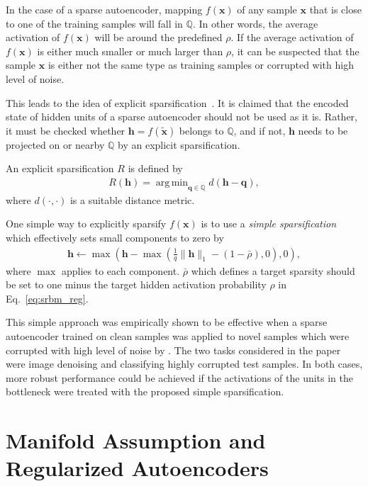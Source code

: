 \documentclass{now}
\newcommand{\vect}[1]{\mathbf{#1}}
\newcommand{\vh}[0]{\vect{h}}
\newcommand{\vx}[0]{\vect{x}}
\newcommand{\vq}[0]{\vect{q}}
\newcommand{\QQ}[0]{\mathbb{Q}}
\DeclareMathOperator*{\argmin}{arg\,min}
\begin{document}
In the case of a sparse autoencoder, mapping $f(\vx)$ of any sample $\vx$ that
is close to one of the training samples will fall in $\QQ$. In other words, the
average activation of $f(\vx)$ will be around the predefined $\rho$. If the
average activation of $f(\vx)$ is either much smaller or much larger than
$\rho$, it can be suspected that the sample $\vx$ is either not the same type as
training samples or corrupted with high level of noise.

This leads to the idea of explicit sparsification~\citep{Cho2013icml}. It is
claimed that the encoded state of hidden units of a sparse autoencoder should
not be used as it is. Rather, it must be checked whether $\vh = f(\tilde{\vx})$
belongs to $\QQ$, and if not, $\vh$ needs to be projected on or nearby $\QQ$ by
an explicit sparsification.

An explicit sparsification $R$ is defined by 
\begin{align}
    \label{eq:esp}
    R(\vh) = \argmin_{\vq \in \QQ} d(\vh - \vq),
\end{align}
where $d(\cdot, \cdot)$ is a suitable distance metric.

One simple way to explicitly sparsify $f(\vx)$ is to use a \textit{simple
sparsification} which effectively sets small components to zero by
\begin{align}
    \label{eq:simple_sparsification}
    \vh \leftarrow \max\left(\vh - \max\left(\frac{1}{q}
    \|\vh\|_1 - \left(1 - \bar{\rho}\right), 0\right),
    0\right),
\end{align}
where $\max$ applies to each component.  $\bar{\rho}$ which defines a target
sparsity should be set to one minus the target hidden activation probability
$\rho$ in Eq.~\eqref{eq:srbm_reg}.

This simple approach was empirically shown to be effective when a sparse
autoencoder trained on clean samples was applied to novel samples which were
corrupted with high level of noise by \citet{Cho2013icml}. The two tasks
considered in the paper were image denoising and classifying highly corrupted
test samples. In both cases, more robust performance could be achieved if the
activations of the units in the bottleneck were treated with the proposed simple
sparsification.

\section{Manifold Assumption and Regularized Autoencoders}
\label{sec:dae_cae}
\end{document}
